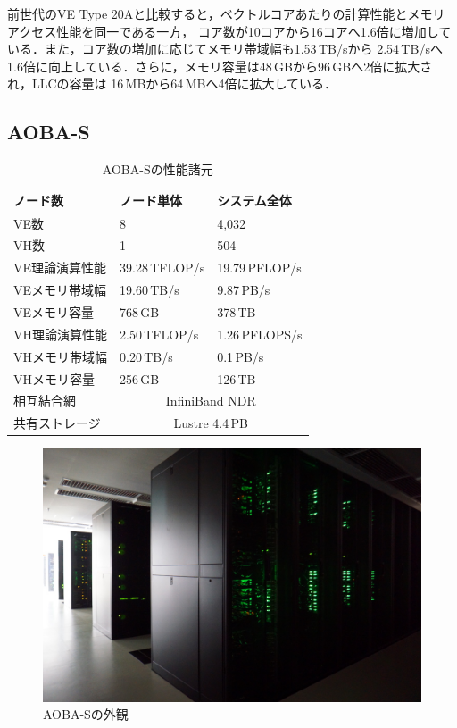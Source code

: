 ﻿\documentclass[submit,techrep,noauthor]{ipsj}
\begin{document}
前世代のVE Type 20Aと比較すると，ベクトルコアあたりの計算性能とメモリアクセス性能を同一である一方，
コア数が10コアから16コアへ1.6倍に増加している．また，コア数の増加に応じてメモリ帯域幅も1.53\,TB/sから
2.54\,TB/sへ1.6倍に向上している．さらに，メモリ容量は48\,GBから96\,GBへ2倍に拡大され，LLCの容量は
16\,MBから64\,MBへ4倍に拡大している．

\subsection{AOBA-S}

\begin{table}
\centering
\caption{AOBA-Sの性能諸元}\label{tbl:aoba-s}
\begin{tabular}{@{}lll@{}}
\toprule
ノード数        & ノード単体     & システム全体           \\ \midrule
VE数            & 8              & 4,032                  \\ \midrule
VH数            & 1              & 504                    \\
VE理論演算性能  & 39.28\,TFLOP/s & 19.79\,PFLOP/s         \\
VEメモリ帯域幅  & 19.60\,TB/s    & 9.87\,PB/s             \\
VEメモリ容量    & 768\,GB        & 378\,TB                \\ \midrule
VH理論演算性能  & 2.50\,TFLOP/s  & 1.26\,PFLOPS/s         \\
VHメモリ帯域幅  & 0.20\,TB/s     & 0.1\,PB/s              \\
VHメモリ容量    & 256\,GB        & 126\,TB                \\ \midrule
相互結合網      & \multicolumn{2}{c}{InfiniBand NDR}      \\
共有ストレージ  & \multicolumn{2}{c}{Lustre 4.4\,PB}      \\ \bottomrule
\end{tabular}
\end{table}

\begin{figure}
  \centering
  \includegraphics[width=.9\columnwidth]{figs/rack.jpg}
  \caption{AOBA-Sの外観}\label{fig:aoba-s}
\end{figure}
\end{document}
